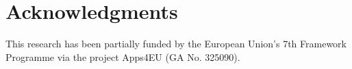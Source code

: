 \documentclass[runningheads,a4paper]{llncs}
\begin{document}

\section*{Acknowledgments}
This research has been partially funded by the European Union's 7th Framework Programme via the project Apps4EU (GA No. 325090).
\vspace{0.5cm}


\nocite{*}

\end{document}
